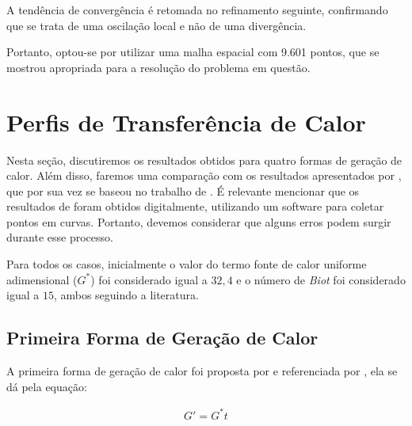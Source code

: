 A tendência de convergência é retomada no refinamento seguinte, confirmando que se trata de uma oscilação local e não de uma divergência.

Portanto, optou-se por utilizar uma malha espacial com 9.601 pontos, que se mostrou apropriada para a resolução do problema em questão.


\section{Perfis de Transferência de Calor}

Nesta seção, discutiremos os resultados obtidos para quatro formas de geração de calor. Além disso, faremos uma comparação com os resultados apresentados por \citet{soares2017}, que por sua vez se baseou no trabalho de \citet{bhattacharya2001}. É relevante mencionar que os resultados de \citet{soares2017} foram obtidos digitalmente, utilizando um software para coletar pontos em curvas. Portanto, devemos considerar que alguns erros podem surgir durante esse processo.

Para todos os casos, inicialmente o valor do termo fonte de calor uniforme adimensional (\(G ^*\)) foi considerado igual a \(32,4\) e o número de \textit{Biot} foi considerado igual a \(15\), ambos seguindo a literatura.

\subsection{Primeira Forma de Geração de Calor}

A primeira forma de geração de calor foi proposta por \citet{bhattacharya2001} e referenciada por \citet{soares2017}, ela se dá pela equação:

\begin{gather}
    G ' = G ^* t
    \label{eq:first_form_of_heat}
\end{gather}

